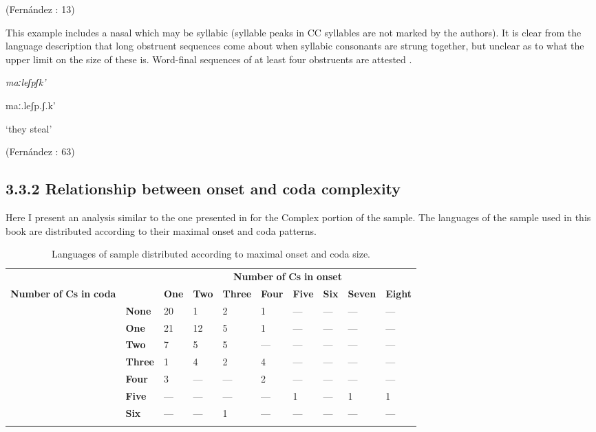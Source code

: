 (Fernández \citealt{GarayHernández2006}: 13)
\z

This example includes a nasal which may be syllabic (syllable peaks in CC syllables are not marked by the authors). It is clear from the language description that long obstruent sequences come about when syllabic consonants are strung together, but unclear as to what the upper limit on the size of these is. Word-final sequences of at least four obstruents are attested .

\ea\label{ex:(3.14)}

\textit{maːleʃpʃk’}

maː.leʃp.ʃ.k’

\glt ‘they steal’

(Fernández \citealt{GarayHernández2006}: 63)

\z

\subsection{3.3.2 Relationship between onset and coda complexity} 

  Here I present an analysis similar to the one presented in  for the Complex portion of the \citet{Maddieson2013a} sample. The languages of the sample used in this book are distributed according to their maximal onset and coda patterns.

\begin{table}
\begin{tabularx}{\textwidth}{XXXXXXXXXX}
\lsptoprule

{} &  & \multicolumn{8}{c}{ \textbf{Number} \textbf{of} \textbf{Cs} \textbf{in} \textbf{onset}}\\
{ \textbf{Number} \textbf{of} \textbf{Cs} \textbf{in} \textbf{coda}} &  & \textbf{One} & \textbf{Two} & \textbf{Three} & \textbf{Four} & \textbf{Five} & \textbf{Six} & \textbf{Seven} & \textbf{Eight}\\
& \textbf{None} & 20 & 1 & 2 & 1 & — & — & — & —\\
\hhline{~---------} & \textbf{One} & 21 & 12 & 5 & 1 & — & — & — & —\\
\hhline{~---------} & \textbf{Two} & 7 & 5 & 5 & — & — & — & — & —\\
\hhline{~---------} & \textbf{Three} & 1 & 4 & 2 & 4 & — & — & — & —\\
\hhline{~---------} & \textbf{Four} & 3 & — & — & 2 & — & — & — & —\\
\hhline{~---------} & \textbf{Five} & — & — & — & — & 1 & — & 1 & 1\\
\hhline{~---------} & \textbf{Six} & — & — & 1 & — & — & — & — & —\\
\hhline{~---------}
\lspbottomrule
\end{tabularx}
\caption{\label{3.2}Languages of sample distributed according to maximal onset and coda size.}
\end{table}


